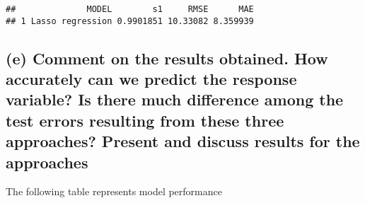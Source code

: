 \documentclass[
]{article}
\newenvironment{Shaded}{\begin{snugshade}}{\end{snugshade}}
\newcommand{\AttributeTok}[1]{\textcolor[rgb]{0.77,0.63,0.00}{#1}}
\newcommand{\CommentTok}[1]{\textcolor[rgb]{0.56,0.35,0.01}{\textit{#1}}}
\newcommand{\DecValTok}[1]{\textcolor[rgb]{0.00,0.00,0.81}{#1}}
\newcommand{\FunctionTok}[1]{\textcolor[rgb]{0.00,0.00,0.00}{#1}}
\newcommand{\NormalTok}[1]{#1}
\newcommand{\OtherTok}[1]{\textcolor[rgb]{0.56,0.35,0.01}{#1}}
\newcommand{\SpecialCharTok}[1]{\textcolor[rgb]{0.00,0.00,0.00}{#1}}
\newcommand{\StringTok}[1]{\textcolor[rgb]{0.31,0.60,0.02}{#1}}
\begin{document}
\begin{Shaded}
\end{Shaded}

\begin{verbatim}
##              MODEL        s1     RMSE      MAE
## 1 Lasso regression 0.9901851 10.33082 8.359939
\end{verbatim}

\hypertarget{e-comment-on-the-results-obtained.-how-accurately-can-we-predict-the-response-variable-is-there-much-difference-among-the-test-errors-resulting-from-these-three-approaches-present-and-discuss-results-for-the-approaches}{%
\subsection{(e) Comment on the results obtained. How accurately can we
predict the response variable? Is there much difference among the test
errors resulting from these three approaches? Present and discuss
results for the
approaches}\label{e-comment-on-the-results-obtained.-how-accurately-can-we-predict-the-response-variable-is-there-much-difference-among-the-test-errors-resulting-from-these-three-approaches-present-and-discuss-results-for-the-approaches}}

The following table represents model performance
\end{document}
